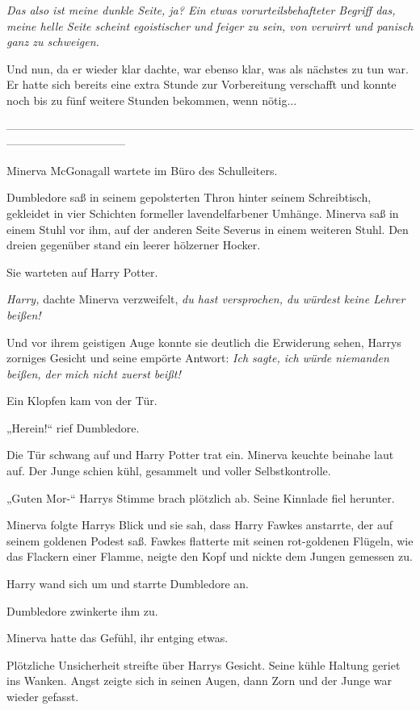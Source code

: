 {\emph{Das also ist meine dunkle Seite, ja? Ein etwas vorurteilsbehafteter Begriff das, meine helle Seite scheint egoistischer und feiger zu sein, von verwirrt und panisch ganz zu schweigen.}

Und nun, da er wieder klar dachte, war ebenso klar, was als nächstes zu tun war. Er hatte sich bereits eine extra Stunde zur Vorbereitung verschafft und konnte noch bis zu fünf weitere Stunden bekommen, wenn nötig...

--------------------------------------------------------------------------------------------------------------------------------------------

\hfill\break Minerva McGonagall wartete im Büro des Schulleiters.

Dumbledore saß in seinem gepolsterten Thron hinter seinem Schreibtisch, gekleidet in vier Schichten formeller lavendelfarbener Umhänge. Minerva saß in einem Stuhl vor ihm, auf der anderen Seite Severus in einem weiteren Stuhl. Den dreien gegenüber stand ein leerer hölzerner Hocker.

Sie warteten auf Harry Potter.

\emph{Harry,} dachte Minerva verzweifelt, \emph{du hast versprochen, du würdest keine Lehrer beißen!}

Und vor ihrem geistigen Auge konnte sie deutlich die Erwiderung sehen, Harrys zorniges Gesicht und seine empörte Antwort: \emph{Ich sagte, ich würde niemanden beißen, der mich nicht zuerst beißt!}

Ein Klopfen kam von der Tür.

„Herein!“ rief Dumbledore.

Die Tür schwang auf und Harry Potter trat ein. Minerva keuchte beinahe laut auf. Der Junge schien kühl, gesammelt und voller Selbstkontrolle.

„Guten Mor-“ Harrys Stimme brach plötzlich ab. Seine Kinnlade fiel herunter.

Minerva folgte Harrys Blick und sie sah, dass Harry Fawkes anstarrte, der auf seinem goldenen Podest saß. Fawkes flatterte mit seinen rot-goldenen Flügeln, wie das Flackern einer Flamme, neigte den Kopf und nickte dem Jungen gemessen zu.

Harry wand sich um und starrte Dumbledore an.

Dumbledore zwinkerte ihm zu.

Minerva hatte das Gefühl, ihr entging etwas.

Plötzliche Unsicherheit streifte über Harrys Gesicht. Seine kühle Haltung geriet ins Wanken. Angst zeigte sich in seinen Augen, dann Zorn und der Junge war wieder gefasst.

}
